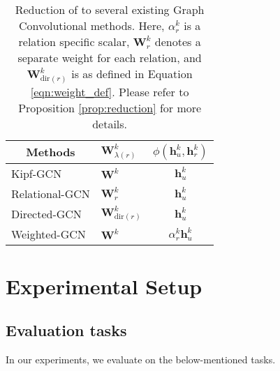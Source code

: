 \documentclass{article} \usepackage{iclr2020_conference,times}
\begin{document}
\begin{table}[t]
	\centering
	\small
	\begin{tabular}{llc}
		\toprule
		\multicolumn{1}{c}{\textbf{Methods}} & $\bm{W}^k_{\lambda(r)}$ & $\phi(\bm{h}^k_{u}, \bm{h}^k_r)$ \\ 
		\midrule
		Kipf-GCN \citep{Kipf2016} & $\bm{W}^k$ & $\bm{h}^k_u$ \vspace{0.5mm}\\ 
		Relational-GCN  \citep{r_gcn} & $\bm{W}^k_r$ & $\bm{h}^k_u$ \vspace{0.5mm}\\ 
		Directed-GCN \citep{gcn_srl} & $\bm{W}^k_{\mathrm{dir}(r)}$ & $\bm{h}^k_u$ \vspace{0.5mm}\\ 
		Weighted-GCN  \citep{sacn_paper} & $\bm{W}^k$ & $\alpha^k_{r} \bm{h}^k_u$\\ 
\bottomrule
	\end{tabular}
	
	\caption{\label{tbl:reduction}Reduction of \method{} to several existing Graph Convolutional methods. Here, $\alpha^k_r$ is a relation specific scalar, $\bm{W}^k_r$ denotes a separate weight for each relation, and $\bm{W}^k_{\mathrm{dir}(r)}$ is as defined in Equation \ref{eqn:weight_def}. Please refer to Proposition \ref{prop:reduction} for more details.}
\end{table}





 \section{Experimental Setup}













\subsection{Evaluation tasks}
\label{sec:exp_tasks}
In our experiments, we evaluate \method{} on the below-mentioned tasks.
\end{document}
